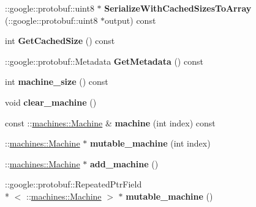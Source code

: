 \begin{DoxyCompactItemize}
\item 
\hypertarget{classmachines_1_1Machines_a099db6b410274cfbefa04a846a3cd878}{\-::google\-::protobuf\-::uint8 $\ast$ {\bfseries Serialize\-With\-Cached\-Sizes\-To\-Array} (\-::google\-::protobuf\-::uint8 $\ast$output) const }\label{classmachines_1_1Machines_a099db6b410274cfbefa04a846a3cd878}

\item 
\hypertarget{classmachines_1_1Machines_a34a4b4e07ff4b4533120ceace8a978f8}{int {\bfseries Get\-Cached\-Size} () const }\label{classmachines_1_1Machines_a34a4b4e07ff4b4533120ceace8a978f8}

\item 
\hypertarget{classmachines_1_1Machines_a9e3cb699d42495f73e09ef78bdedb2eb}{\-::google\-::protobuf\-::\-Metadata {\bfseries Get\-Metadata} () const }\label{classmachines_1_1Machines_a9e3cb699d42495f73e09ef78bdedb2eb}

\item 
\hypertarget{classmachines_1_1Machines_a61b3c3827f4473c4ae4dacb70de89b7e}{int {\bfseries machine\-\_\-size} () const }\label{classmachines_1_1Machines_a61b3c3827f4473c4ae4dacb70de89b7e}

\item 
\hypertarget{classmachines_1_1Machines_ae910dc1ade7da741cbf1d0585bae15e4}{void {\bfseries clear\-\_\-machine} ()}\label{classmachines_1_1Machines_ae910dc1ade7da741cbf1d0585bae15e4}

\item 
\hypertarget{classmachines_1_1Machines_aa8191eefb09e64b6b0b1014065582a81}{const \-::\hyperlink{classmachines_1_1Machine}{machines\-::\-Machine} \& {\bfseries machine} (int index) const }\label{classmachines_1_1Machines_aa8191eefb09e64b6b0b1014065582a81}

\item 
\hypertarget{classmachines_1_1Machines_a46d3142739a905e6b942d2b1524c7267}{\-::\hyperlink{classmachines_1_1Machine}{machines\-::\-Machine} $\ast$ {\bfseries mutable\-\_\-machine} (int index)}\label{classmachines_1_1Machines_a46d3142739a905e6b942d2b1524c7267}

\item 
\hypertarget{classmachines_1_1Machines_a7ee40fc6cbd46314c0532a8a635d79a2}{\-::\hyperlink{classmachines_1_1Machine}{machines\-::\-Machine} $\ast$ {\bfseries add\-\_\-machine} ()}\label{classmachines_1_1Machines_a7ee40fc6cbd46314c0532a8a635d79a2}

\item 
\hypertarget{classmachines_1_1Machines_a76d1b295f2268d52ea966f2812877df8}{\-::google\-::protobuf\-::\-Repeated\-Ptr\-Field\\*
$<$ \-::\hyperlink{classmachines_1_1Machine}{machines\-::\-Machine} $>$ $\ast$ {\bfseries mutable\-\_\-machine} ()}\label{classmachines_1_1Machines_a76d1b295f2268d52ea966f2812877df8}


\end{DoxyCompactItemize}
